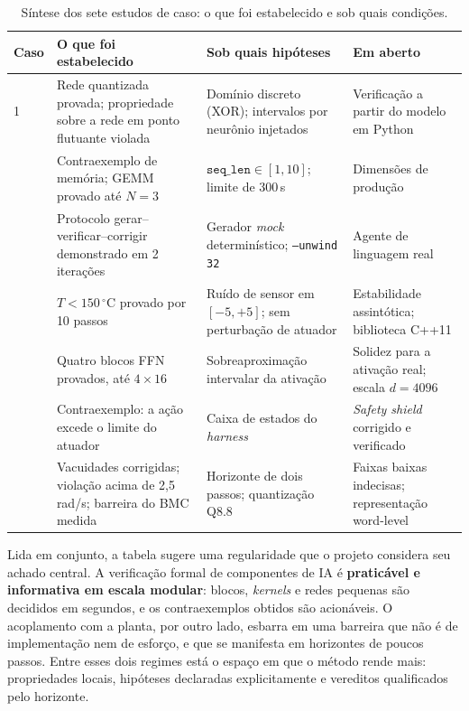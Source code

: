 \begin{table}[H]
\centering
\caption{Síntese dos sete estudos de caso: o que foi estabelecido e sob quais condições.}
\label{tab:sintese}
\footnotesize
\begin{tabular}{@{}p{1.5cm}p{4.4cm}p{4.0cm}p{3.6cm}@{}}
\toprule
\textbf{Caso} & \textbf{O que foi estabelecido} & \textbf{Sob quais hipóteses} &
\textbf{Em aberto} \\
\midrule
1 & Rede quantizada provada; propriedade sobre a rede em ponto flutuante violada &
Domínio discreto (XOR); intervalos por neurônio injetados &
Verificação a partir do modelo em Python \\
\addlinespace
2 & Contraexemplo de memória; GEMM provado até $N{=}3$ &
$\texttt{seq\_len} \in [1,10]$; limite de 300\,s &
Dimensões de produção \\
\addlinespace
3 & Protocolo gerar--verificar--corrigir demonstrado em 2 iterações &
Gerador \textit{mock} determinístico; \texttt{--unwind 32} &
Agente de linguagem real \\
\addlinespace
4 & $T < 150\,^\circ$C provado por 10 passos &
Ruído de sensor em $[-5,+5]$; sem perturbação de atuador &
Estabilidade assintótica; biblioteca C++11 \\
\addlinespace
5 & Quatro blocos FFN provados, até $4{\times}16$ &
Sobreaproximação intervalar da ativação &
Solidez para a ativação real; escala $d{=}4096$ \\
\addlinespace
6 & Contraexemplo: a ação excede o limite do atuador &
Caixa de estados do \textit{harness} &
\textit{Safety shield} corrigido e verificado \\
\addlinespace
7 & Vacuidades corrigidas; violação acima de 2,5\,rad/s; barreira do BMC medida &
Horizonte de dois passos; quantização Q8.8 &
Faixas baixas indecisas; representação word-level \\
\bottomrule
\end{tabular}
\end{table}

Lida em conjunto, a tabela sugere uma regularidade que o projeto considera seu achado central.
A verificação formal de componentes de IA é \textbf{praticável e informativa em escala
modular}: blocos, \textit{kernels} e redes pequenas são decididos em segundos, e os
contraexemplos obtidos são acionáveis. O acoplamento com a planta, por outro lado, esbarra em
uma barreira que não é de implementação nem de esforço, e que se manifesta em horizontes de
poucos passos. Entre esses dois regimes está o espaço em que o método rende mais: propriedades
locais, hipóteses declaradas explicitamente e vereditos qualificados pelo horizonte.
